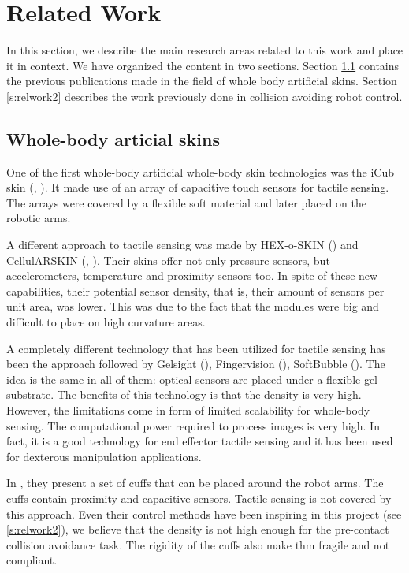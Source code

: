 \chapter{Related Work}
\label{relworkchap}

In this section, we describe the main research areas related to this work and place it in context. We have organized the content in two sections. Section \ref{s:relwork1} contains the previous publications made in the field of whole body artificial skins. Section \ref{s:relwork2} describes the work previously done in collision avoiding robot control.

\section{Whole-body articial skins}
\label{s:relwork1}

One of the first whole-body artificial whole-body skin technologies was the iCub skin (\cite{metta2010icub}, \cite{schmitz2011methods}). It made use of an array of capacitive touch sensors for tactile sensing. The arrays were covered by a flexible soft material and later placed on the robotic arms.

A different approach to tactile sensing was made by HEX-o-SKIN (\cite{7793823}) and CellulARSKIN (\cite{5711674}, \cite{mittendorfer2015realizing}). Their skins offer not only pressure sensors, but accelerometers, temperature and proximity sensors too. In spite of these new capabilities, their potential sensor density, that is, their amount of sensors per unit area, was lower. This was due to the fact that the modules were big and difficult to place on high curvature areas.

A completely different technology that has been utilized for tactile sensing has been the approach followed by Gelsight (\cite{yuan2017gelsight}), Fingervision (\cite{yamaguchi2017implementing}), SoftBubble (\cite{alspach2019soft}). The idea is the same in all of them: optical sensors are placed under a flexible gel substrate. The benefits of this technology is that the density is very high. However, the limitations come in form of limited scalability for whole-body sensing. The computational power required to process images is very high. In fact, it is a good technology for end effector tactile sensing and it has been used for dexterous manipulation applications.

In \cite{ding2019proximity}, they present a set of cuffs that can be placed around the robot arms. The cuffs contain proximity and capacitive sensors. Tactile sensing is not covered by this approach. Even their control methods have been inspiring in this project (see \ref{s:relwork2}), we believe that the density is not high enough for the pre-contact collision avoidance task. The rigidity of the cuffs also make thm fragile and not compliant.


